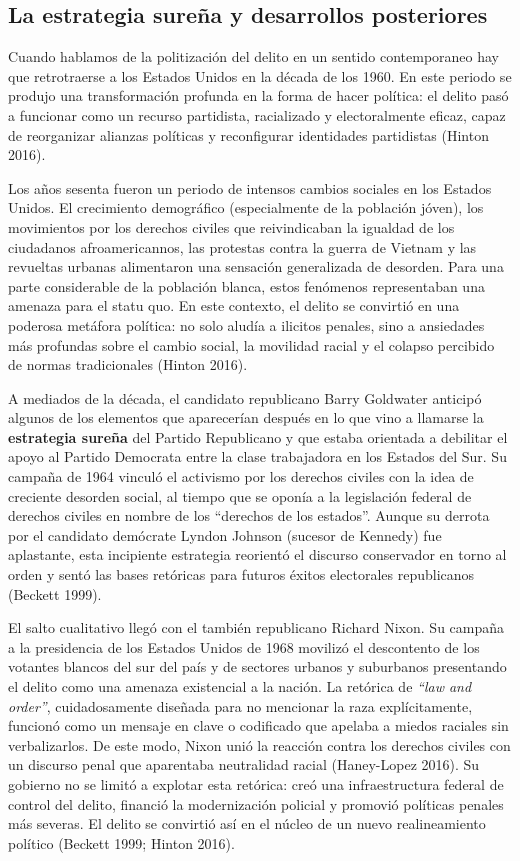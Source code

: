 \documentclass[
  spanish,
  letterpaper,
  DIV=11,
  numbers=noendperiod]{scrreprt}
\begin{document}
\subsection{La estrategia sureña y desarrollos
posteriores}\label{la-estrategia-sureuxf1a-y-desarrollos-posteriores}

Cuando hablamos de la politización del delito en un sentido
contemporaneo hay que retrotraerse a los Estados Unidos en la década de
los 1960. En este periodo se produjo una transformación profunda en la
forma de hacer política: el delito pasó a funcionar como un recurso
partidista, racializado y electoralmente eficaz, capaz de reorganizar
alianzas políticas y reconfigurar identidades partidistas (Hinton 2016).

Los años sesenta fueron un periodo de intensos cambios sociales en los
Estados Unidos. El crecimiento demográfico (especialmente de la
población jóven), los movimientos por los derechos civiles que
reivindicaban la igualdad de los ciudadanos afroamericannos, las
protestas contra la guerra de Vietnam y las revueltas urbanas
alimentaron una sensación generalizada de desorden. Para una parte
considerable de la población blanca, estos fenómenos representaban una
amenaza para el statu quo. En este contexto, el delito se convirtió en
una poderosa metáfora política: no solo aludía a ilicitos penales, sino
a ansiedades más profundas sobre el cambio social, la movilidad racial y
el colapso percibido de normas tradicionales (Hinton 2016).

A mediados de la década, el candidato republicano Barry Goldwater
anticipó algunos de los elementos que aparecerían después en lo que vino
a llamarse la \textbf{estrategia sureña} del Partido Republicano y que
estaba orientada a debilitar el apoyo al Partido Democrata entre la
clase trabajadora en los Estados del Sur. Su campaña de 1964 vinculó el
activismo por los derechos civiles con la idea de creciente desorden
social, al tiempo que se oponía a la legislación federal de derechos
civiles en nombre de los ``derechos de los estados''. Aunque su derrota
por el candidato demócrate Lyndon Johnson (sucesor de Kennedy) fue
aplastante, esta incipiente estrategia reorientó el discurso conservador
en torno al orden y sentó las bases retóricas para futuros éxitos
electorales republicanos (Beckett 1999).

El salto cualitativo llegó con el también republicano Richard Nixon. Su
campaña a la presidencia de los Estados Unidos de 1968 movilizó el
descontento de los votantes blancos del sur del país y de sectores
urbanos y suburbanos presentando el delito como una amenaza existencial
a la nación. La retórica de \emph{``law and order''}, cuidadosamente
diseñada para no mencionar la raza explícitamente, funcionó como un
mensaje en clave o codificado que apelaba a miedos raciales sin
verbalizarlos. De este modo, Nixon unió la reacción contra los derechos
civiles con un discurso penal que aparentaba neutralidad racial
(Haney-Lopez 2016). Su gobierno no se limitó a explotar esta retórica:
creó una infraestructura federal de control del delito, financió la
modernización policial y promovió políticas penales más severas. El
delito se convirtió así en el núcleo de un nuevo realineamiento político
(Beckett 1999; Hinton 2016).
\end{document}
